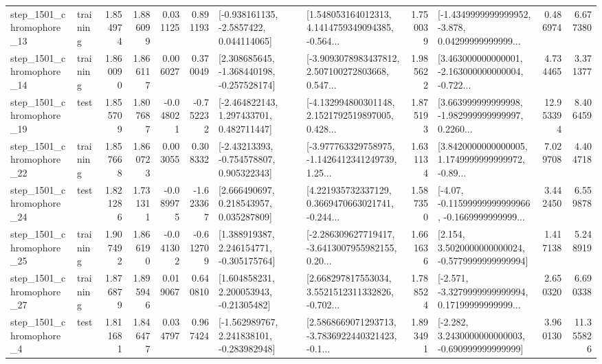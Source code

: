 \begin{tabular}{llrrrrllrlrr}
 step\_1501\_chromophore\_13 &  training &      1.854974 &    1.886099 &      0.031125 &  0.891193 &     [-0.938161135, -2.5857422, 0.044114065] &  [1.548053164012313, 4.1414759349094385, -0.564... &       1.750039 &  [-1.4349999999999952, -3.878, 0.04299999999999... &            0.486974 &          6.677380 \\
 step\_1501\_chromophore\_14 &  training &      1.860090 &    1.866117 &      0.006027 &  0.370049 &   [2.308685645, -1.368440198, -0.257528174] &  [-3.9093078983437812, 2.507100272803668, 0.547... &       1.985622 &  [3.463000000000001, -2.163000000000004, -0.722... &            4.734465 &          3.371377 \\
 step\_1501\_chromophore\_19 &      test &      1.855709 &    1.807687 &     -0.048021 & -0.752232 &    [-2.464822143, 1.297433701, 0.482711447] &  [-4.132994800301148, 2.1521792519897005, 0.428... &       1.875193 &  [3.663999999999998, -1.982999999999997, 0.2260... &           12.953394 &          8.406459 \\
 step\_1501\_chromophore\_22 &  training &      1.857668 &    1.860723 &      0.003055 &  0.308332 &    [-2.43213393, -0.754578807, 0.905322343] &  [-3.977763329758975, -1.1426412341249739, 1.25... &       1.631134 &  [3.8420000000000005, 1.1749999999999972, -0.89... &            7.029708 &          4.404718 \\
 step\_1501\_chromophore\_24 &      test &      1.821286 &    1.731311 &     -0.089975 & -1.623367 &     [2.666490697, 0.218543957, 0.035287809] &  [4.221935732337129, 0.3669470663021741, -0.244... &       1.587350 &  [-4.07, -0.11599999999999966, -0.1669999999999... &            3.442450 &          6.559878 \\
 step\_1501\_chromophore\_25 &  training &      1.907492 &    1.866190 &     -0.041302 & -0.612709 &    [1.388919387, 2.246154771, -0.305175764] &  [-2.286309627719417, -3.6413007955982155, 0.20... &       1.661636 &   [2.154, 3.5020000000000024, -0.5779999999999994] &            1.417138 &          5.248919 \\
 step\_1501\_chromophore\_27 &  training &      1.876879 &    1.895946 &      0.019067 &  0.640810 &     [1.604858231, 2.200053943, -0.21305482] &  [2.668297817553034, 3.5521512311332826, -0.702... &       1.788524 &  [-2.571, -3.3279999999999994, 0.17199999999999... &            2.650320 &          6.690338 \\
  step\_1501\_chromophore\_4 &      test &      1.811681 &    1.846477 &      0.034797 &  0.967424 &   [-1.562989767, 2.241838101, -0.283982948] &  [2.5868669071293713, -3.7836922440321423, -0.1... &       1.893491 &   [-2.282, 3.2430000000000003, -0.690999999999999] &            3.960130 &         11.355826 \\

\end{tabular}
